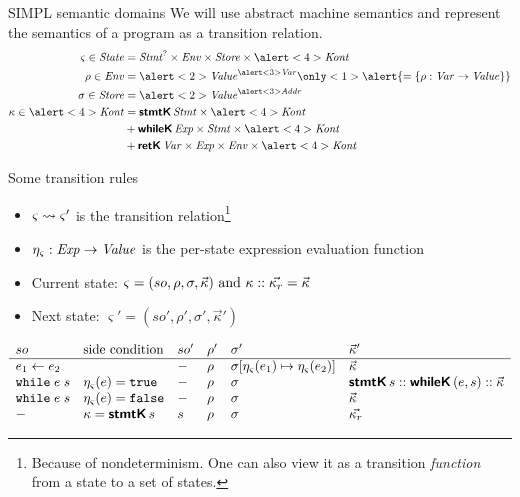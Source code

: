 \documentclass[aspectratio=169]{beamer}
\begin{document}
\begin{frame}{SIMPL semantic domains}
  \begingroup\footnotesize We will use abstract machine semantics and represent the semantics of a program as a transition relation.\endgroup
\begin{align*}
    \varsigma \in \State & = \Stmt^? \times \Env \times \Store \times \alert<4>{\Kont} \\
    \rho \in \Env & = \alert<2>{\Value}^{\alert<3>{\Var}} \only<1>{\alert{= \Set{\rho : \Var \to \Value}}} \\
    \sigma \in \Store & = \alert<2>{\Value}^{\alert<3>{\Addr}} \\
    \kappa \in \alert<4>{\Kont} & = \sTag{stmtK}{\Stmt \times \alert<4>{\Kont}} \\
                         & \disunion \sTag{whileK}{\Exp \times \Stmt \times \alert<4>{\Kont}} \\
                         & \disunion \sTag{retK}{\Var \times \Exp \times \Env \times \alert<4>{\Kont}}
\end{align*}
\end{frame}

\begin{frame}{Some transition rules}
  \small
  \begin{itemize}
  \item $\varsigma \rightsquigarrow \varsigma'$ is the transition relation\footnote{Because of nondeterminism. One can also view it as a transition \emph{function} from a state to a set of states.}
  \item \(\eta_\varsigma : \mathit{Exp} \to \mathit{Value} \) is the per-state expression evaluation function
\item Current state: \(\varsigma = (so, \rho, \sigma, \vec{\kappa})$ and $\kappa :: \vec{\kappa_r} = \vec{\kappa} \)
\item Next state: \( \varsigma' = (so', \rho', \sigma', \vec{\kappa}') \) \pause
  \end{itemize}
  \footnotesize
  \[
  \begin{array}{llllll}
    so & \text{side condition} & so' & \rho' & \sigma' & \vec{\kappa}' \\ \hline
    e_1 \leftarrow e_2 & & - & \rho & \sigma[\eta_\varsigma(e_1) \mapsto \eta_\varsigma(e_2)] & \vec{\kappa} \\
    \texttt{while}\; e\; s & \eta_\varsigma(e) = \texttt{true} & - & \rho & \sigma & \textsf{\textbf{stmtK}}\,s :: \textsf{\textbf{whileK}}\,(e, s) :: \vec{\kappa} \\
    \texttt{while}\; e\; s & \eta_\varsigma(e) = \texttt{false} & - & \rho & \sigma & \vec{\kappa} \\
    - & \kappa = \textsf{\textbf{stmtK}}\,s & s & \rho & \sigma & \vec{\kappa_r}
  \end{array}
  \]
\end{frame}
\end{document}
